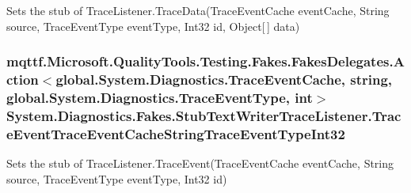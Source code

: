 Sets the stub of Trace\-Listener.\-Trace\-Data(\-Trace\-Event\-Cache event\-Cache, String source, Trace\-Event\-Type event\-Type, Int32 id, Object\mbox{[}$\,$\mbox{]} data)

\hypertarget{class_system_1_1_diagnostics_1_1_fakes_1_1_stub_text_writer_trace_listener_a1cb76e3a228d172584f2044501bf167d}{
\subsubsection[{Trace\-Event\-Trace\-Event\-Cache\-String\-Trace\-Event\-Type\-Int32}]{\setlength{\rightskip}{0pt plus 5cm}mqttf.\-Microsoft.\-Quality\-Tools.\-Testing.\-Fakes.\-Fakes\-Delegates.\-Action$<$global.\-System.\-Diagnostics.\-Trace\-Event\-Cache, string, global.\-System.\-Diagnostics.\-Trace\-Event\-Type, int$>$ System.\-Diagnostics.\-Fakes.\-Stub\-Text\-Writer\-Trace\-Listener.\-Trace\-Event\-Trace\-Event\-Cache\-String\-Trace\-Event\-Type\-Int32}}\label{class_system_1_1_diagnostics_1_1_fakes_1_1_stub_text_writer_trace_listener_a1cb76e3a228d172584f2044501bf167d}


Sets the stub of Trace\-Listener.\-Trace\-Event(\-Trace\-Event\-Cache event\-Cache, String source, Trace\-Event\-Type event\-Type, Int32 id)

